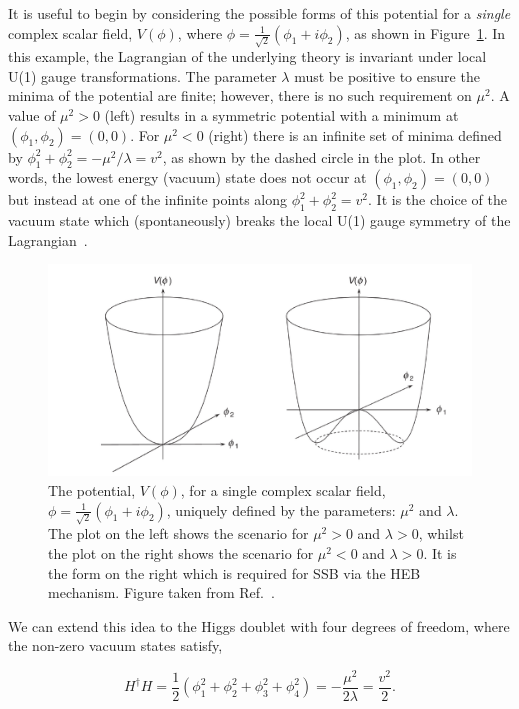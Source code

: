 \noindent
It is useful to begin by considering the possible forms of this potential for a \textit{single} complex scalar field, $V(\phi)$, where $\phi=\frac{1}{\sqrt{2}}(\phi_1+i\phi_2)$, as shown in Figure~\ref{fig:higgs_potential}. In this example, the Lagrangian of the underlying theory is invariant under local U(1) gauge transformations. The parameter $\lambda$ must be positive to ensure the minima of the potential are finite; however, there is no such requirement on $\mu^2$. A value of $\mu^2>0$ (left) results in a symmetric potential with a minimum at $(\phi_1,\phi_2)=(0,0)$. For $\mu^2<0$ (right) there is an infinite set of minima defined by $\phi_1^2+\phi_2^2=-\mu^2/\lambda=v^2$, as shown by the dashed circle in the plot. In other words, the lowest energy (vacuum) state does not occur at $(\phi_1,\phi_2)=(0,0)$ but instead at one of the infinite points along $\phi_1^2+\phi_2^2=v^2$. It is the choice of the vacuum state which (spontaneously) breaks the local U(1) gauge symmetry of the Lagrangian~\cite{Thomson:2013zua}.

\begin{figure}[htb!]
  \centering
  \includegraphics[width=.65\linewidth]{Figures/theory/higgs_potential.pdf}
  \caption[The Higgs potential]
  {
    The potential, $V(\phi)$, for a single complex scalar field, $\phi=\frac{1}{\sqrt{2}}(\phi_1+i\phi_2)$, uniquely defined by the parameters: $\mu^2$ and $\lambda$. The plot on the left shows the scenario for $\mu^2>0$ and $\lambda>0$, whilst the plot on the right shows the scenario for $\mu^2<0$ and $\lambda>0$. It is the form on the right which is required for SSB via the HEB mechanism. Figure taken from Ref.~\cite{Thomson:2013zua}.
  }
  \label{fig:higgs_potential}
\end{figure}

We can extend this idea to the Higgs doublet with four degrees of freedom, where the non-zero vacuum states satisfy,

\begin{equation}
    H^{\dagger}H = \frac{1}{2}(\phi_1^2+\phi_2^2+\phi_3^2+\phi_4^2) = -\frac{\mu^2}{2\lambda} = \frac{v^2}{2}.
\end{equation}

